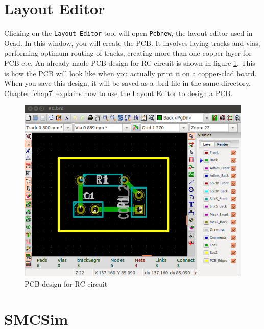 \section{Layout Editor}
Clicking on the {\tt Layout Editor} tool will open {\tt Pcbnew}, the layout editor used in Ocad. In this window, you will create the PCB. It involves laying tracks and vias, performing optimum routing of tracks, creating more than one copper layer for PCB etc. An already made PCB design for RC circuit is shown in figure \ref{pcb-RC}. This is how the PCB will look like when you actually print it on a copper-clad board. When you save this design, it will be saved as a .brd file in the same directory. Chapter \ref{chap7} explains how to use the Layout Editor to design a PCB.

\begin{figure}
\begin{center}
\includegraphics[width=0.8\linewidth]{figures/pcb-rc.png}
\caption{PCB design for RC circuit}
\label{pcb-RC}
\end{center}
\end{figure}


\section{SMCSim}

